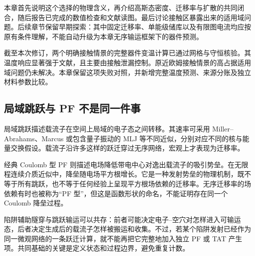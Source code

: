 \documentclass[11pt,a4paper]{article}
\begin{document}
{\cjkfont 本章首先说明这个选择的物理含义，再介绍高斯态密度、迁移率与扩散的共同闭合，随后报告已完成的数值检查和文献读图。最后讨论接触区暴露出来的适用域问题。后续章节保留早期探索：其中固定迁移率、单能级储库以及有限图电流均应按原有条件理解，不能自动升级为本章无序输运框架下的器件预测。}\allowbreak{}

{\cjkfont 截至本次修订，两个明确接触情景的完整器件变温计算已通过网格与守恒核验。其温度响应显著强于文献，且主要由接触泄漏控制。原近欧姆接触情景的高占据适用域问题仍未解决。本章保留这项失败对照，并新增完整温度预测、来源分账及独立材料参数比较。}\allowbreak{}

\subsection{{\cjkfont 局域跳跃与}\allowbreak{} PF {\cjkfont 不是同一件事}\allowbreak{}}
{\cjkfont 局域跳跃描述载流子在空间上局域的电子态之间转移。其速率可采用}\allowbreak{} Miller--Abrahams{\cjkfont 、}\allowbreak{}Marcus {\cjkfont 或包含量子振动的}\allowbreak{} MLJ {\cjkfont 等不同近似，分别对应不同的核与能量交换假设。载流子沿许多这样的跃迁穿过无序网络，宏观上才表现为迁移率。}\allowbreak{}

{\cjkfont 经典}\allowbreak{} Coulomb {\cjkfont 型}\allowbreak{} PF {\cjkfont 则描述电场降低带电中心对逸出载流子的吸引势垒。在无限程连续介质近似中，降垒随电场平方根增长。它是一种发射势垒的物理机制，既不等于所有跳跃，也不等于任何经验上呈现平方根场依赖的迁移率。无序迁移率的场依赖有时也被称为}\allowbreak{}“PF {\cjkfont 型}\allowbreak{}”{\cjkfont ，但这是函数形状的命名，不能证明存在同一个}\allowbreak{} Coulomb {\cjkfont 降垒过程。}\allowbreak{}

{\cjkfont 陷阱辅助隧穿与跳跃输运可以共存：前者可能决定电子}\allowbreak{}--{\cjkfont 空穴对怎样进入可输运态，后者决定生成后的载流子怎样被搬运和收集。不过，若某个陷阱发射已经作为同一微观网络的一条跃迁计算，就不能再把它完整地加入独立}\allowbreak{} PF {\cjkfont 或}\allowbreak{} TAT {\cjkfont 产生项。共同基础的关键是定义状态和过程边界，避免重复计数。}\allowbreak{}
\end{document}
